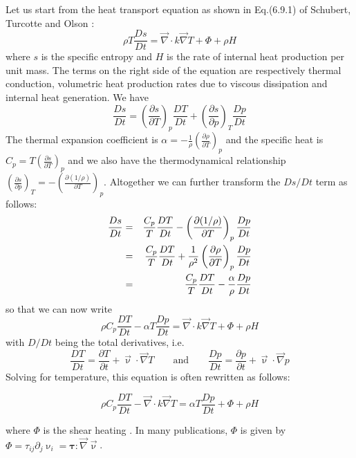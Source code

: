 Let us start from the heat transport equation as shown in Eq.(6.9.1)
of Schubert, Turcotte and Olson \cite{scto01}:
\begin{equation}
\rho T \frac{Ds}{Dt} = {\vec \nabla} \cdot k {\vec \nabla} T + \Phi + \rho H  
\end{equation}
where $s$ is the specific entropy and $H$ is the rate of internal heat production
per unit mass. The terms on the right side of the equation are respectively
thermal conduction, volumetric heat production rates
due to viscous dissipation and internal heat generation.
We have 
\[
\frac{Ds}{Dt} = 
\left( \frac{\partial s}{\partial T} \right)_p \frac{DT}{Dt}
+
\left( \frac{\partial s}{\partial p} \right)_T \frac{Dp}{Dt}
\]
The thermal expansion coefficient is
$\alpha = -\frac{1}{\rho} \left(\frac{\partial \rho}{\partial T} \right)_p$
and the specific heat is 
$C_p = T \left( \frac{\partial s}{\partial T} \right)_p$
and we also have the thermodynamical relationship
$
\left( \frac{\partial s}{\partial p}  \right)_T
=
-\left( \frac{\partial (1/\rho)}{\partial T}  \right)_p
$. 
Altogether we can further transform the $Ds/Dt$ term as follows:
\begin{eqnarray}
\frac{Ds}{Dt} 
&=& 
\frac{C_p}{T}\frac{DT}{Dt}-\left( \frac{\partial (1/\rho)}{\partial T}  \right)_p \frac{Dp}{Dt} \nonumber\\
&=& 
\frac{C_p}{T}\frac{DT}{Dt}+\frac{1}{\rho^2} \left( \frac{\partial \rho}{\partial T}\right)_p\frac{Dp}{Dt}\nonumber\\
&=& 
\frac{C_p}{T}\frac{DT}{Dt} - \frac{\alpha}{\rho} \frac{Dp}{Dt}\nonumber
\end{eqnarray}
so that we can now write
\begin{equation}
\rho C_p \frac{DT}{Dt} - \alpha T \frac{Dp}{Dt} = {\vec \nabla} \cdot k {\vec \nabla} T + \Phi + \rho H  
\end{equation}
with $D/Dt$ being the total derivatives, i.e. 
\begin{equation}
\frac{DT}{Dt} = \frac{\partial T}{\partial t} + {\vec \upnu}\cdot {\vec \nabla}T
\qquad
\text{and}
\qquad
\frac{Dp}{Dt} = \frac{\partial p}{\partial t} + {\vec \upnu}\cdot {\vec \nabla}p
\end{equation}
Solving for temperature, this equation is often rewritten as follows:
\begin{mdframed}[backgroundcolor=blue!5]
\begin{equation}
\rho C_p \frac{DT}{Dt} - {\vec \nabla} \cdot k {\vec \nabla} T =  \alpha T \frac{Dp}{Dt} + \Phi + \rho H  
\end{equation}
\end{mdframed}
where $\Phi$ is the shear heating \cite[p287]{reddybook2}. In many publications, $\Phi$ 
is given by $\Phi=\tau_{ij}\partial_j \upnu_i={\bm \tau}:{\vec \nabla}{\vec \upnu}$.

